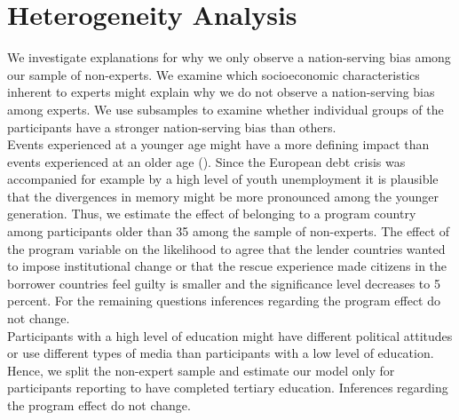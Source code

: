 
\clearpage
\section{Heterogeneity Analysis}

We investigate explanations for why we only observe a nation-serving bias among our sample of non-experts. 
We examine which socioeconomic characteristics inherent to experts might explain why we do not observe a nation-serving bias among experts. We use subsamples to examine whether individual groups of the participants have a stronger nation-serving bias than others.
\\
 Events experienced at a younger age might have a more defining impact than events experienced at an older age (\cite{baumeister}). Since the European debt crisis was accompanied for example by a high level of youth unemployment it is plausible that the divergences in memory might be more pronounced among the younger generation. Thus, we estimate the effect of belonging to a program country among participants older than 35 among the sample of non-experts.  The effect of the program variable on the likelihood to agree that the lender countries wanted to impose institutional change or that the rescue experience made citizens in the borrower countries feel guilty is smaller and the significance level decreases to 5 percent. For the remaining questions inferences regarding the program effect do not change. 
\\
Participants with a high level of education might have different political attitudes or use different types of media than participants with a low level of education. Hence, we split the non-expert sample and estimate our model only for participants reporting to have completed tertiary education. Inferences regarding the program effect do not change. 
\\
